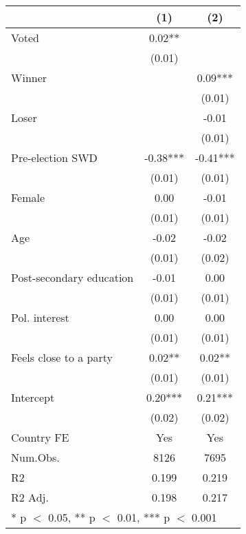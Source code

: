 \begin{table}
\centering
\begin{tabular}[t]{lcc}
\toprule
  & (1) & (2)\\
\midrule
Voted & 0.02** & \\
 & (0.01) & \\
Winner &  & 0.09***\\
 &  & \vphantom{1} (0.01)\\
Loser &  & -0.01\\
 &  & (0.01)\\
Pre-election SWD & -0.38*** & -0.41***\\
 & (0.01) & \vphantom{4} (0.01)\\
Female & 0.00 & -0.01\\
 & (0.01) & \vphantom{3} (0.01)\\
Age & -0.02 & -0.02\\
 & (0.01) & (0.02)\\
Post-secondary education & -0.01 & 0.00\\
 & (0.01) & \vphantom{2} (0.01)\\
Pol. interest & 0.00 & 0.00\\
 & (0.01) & \vphantom{1} (0.01)\\
Feels close to a party & 0.02** & 0.02**\\
 & (0.01) & (0.01)\\
Intercept & 0.20*** & 0.21***\\
 & (0.02) & (0.02)\\
\midrule
Country FE & Yes & Yes\\
Num.Obs. & 8126 & 7695\\
R2 & 0.199 & 0.219\\
R2 Adj. & 0.198 & 0.217\\
\bottomrule
\multicolumn{3}{l}{\rule{0pt}{1em}* p $<$ 0.05, ** p $<$ 0.01, *** p $<$ 0.001}\\
\end{tabular}
\end{table}
